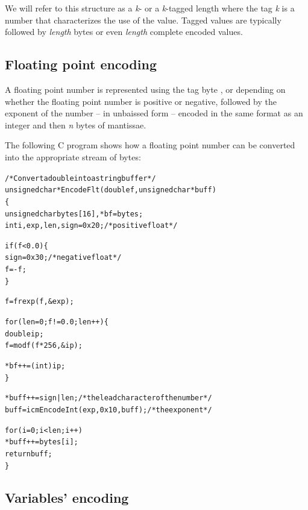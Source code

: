 We will refer to this structure as a \emph{k}- or a \emph{k}-tagged length where the tag \emph{k} is a number that characterizes the use of the value. Tagged values are typically followed by \emph{length} bytes or even \emph{length} complete encoded values.



\subsection{Floating point encoding}
\label{encoded:float}

A floating point number is represented using the tag byte , or  depending on whether the floating point number is positive or negative, followed by the exponent of the number -- in unbaissed form -- encoded in the same format as an integer and then \emph{n} bytes of mantissae.

The following C program shows how a floating point number can be
converted into the appropriate stream of bytes:

\begin{alltt}
/* Convert a double into a string buffer */
unsigned char *EncodeFlt(double f, unsigned char *buff)
\{
  unsigned char bytes[16], *bf = bytes;
 int i,exp,len,sign=0x20; /* positive float */

  if(f<0.0)\{
   sign = 0x30;         /* negative float */
    f = -f;
  \}

  f = frexp(f, &exp);

  for(len=0;f!=0.0;len++)\{
    double ip;
    f = modf(f*256,&ip);

    *bf++ = (int)ip;
  \}

 *buff++=sign|len;      /* the lead character of the number */
 buff = icmEncodeInt(exp,0x10,buff); /* the exponent */

  for(i=0;i<len;i++)
   *buff++=bytes[i];
  return buff;
\}
\end{alltt}

\subsection{Variables' encoding}
\label{encoded:variable}

